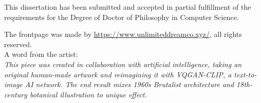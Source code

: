 
\vspace*{\fill}
\vspace*{\fill}
\vspace*{\fill}
\begin{center}
This dissertation has been submitted and accepted in partial fulfillment of
the requirements for the Degree of Doctor of Philosophy in
Computer Science.

\end{center}

\vspace*{\fill}
\vspace*{\fill}
\vspace*{\fill}
\newpage


\vspace*{\fill}
\begin{center}

The frontpage was made by \href{Unlimited Dream Co.}{https://www.unlimiteddreamco.xyz/}, all rights reserved.\\
A word from the artist: \\
\textit{This piece was created in collaboration with artificial intelligence, taking an original human-made artwork and reimagining it with VQGAN-CLIP, a text-to-image AI network. The end result mixes 1960s Brutalist architecture and 18th-century botanical illustration to unique effect.}

\end{center}
\vspace*{\fill}
\vspace*{\fill}
\vspace*{\fill}
